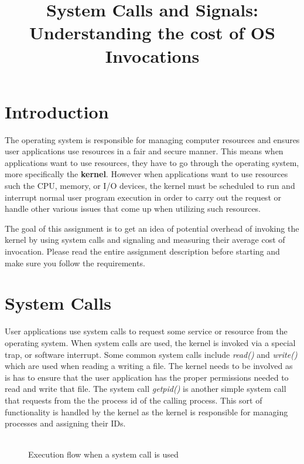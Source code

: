 \documentclass{article}
\title{\textbf{System Calls and Signals:}\\ Understanding the cost of OS Invocations} %
\date{} %
\begin{document}
\maketitle %


\section*{Introduction}
The operating system is responsible for managing computer resources and ensures user applications use resources in a fair and secure manner. This means when applications want to use resources, they have to go through the operating system, more specifically the \textbf{kernel}. However when applications want to use resources such the CPU, memory, or I/O devices, the kernel must be scheduled to run and interrupt normal user program execution in order to carry out the request or handle other various issues that come up when utilizing such resources. 

The goal of this assignment is to get an idea of potential overhead of invoking the kernel by using system calls and signaling and measuring their average cost of invocation. Please read the entire assignment description before starting and make sure you follow the requirements.

\section{System Calls}
User applications use system calls to request some service or resource from the operating system. When system calls are used, the kernel is invoked via a special trap, or software interrupt.  Some common system calls include \textit{read()} and \textit{write()} which are used when reading a writing a file. The kernel needs to be involved as is has to ensure that the user application has the proper permissions needed to read and write that file. The system call \textit{getpid()} is another simple system call that requests from the the process id of the calling process. This sort of functionality is handled by the kernel as the kernel is responsible for managing processes and assigning their IDs.  \\\\

 \begin{figure}[!htb]
        \captionsetup{justification=centering}
        \caption{Execution flow when a system call is used}
\end{figure}
\end{document}
